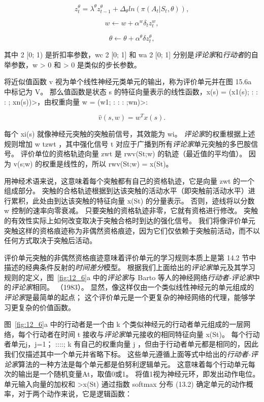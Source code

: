 \begin{equation}
	z_t^{\theta} = \lambda^{\theta} z_{t-1}^{\theta}
		+ \Delta_{\theta} ln(\pi(A_t | S_t, \theta)),
\end{equation}


\begin{equation}
	w \longleftarrow w + \alpha^w \delta_t z_t^w,
\end{equation}

\begin{equation}
	\theta \longleftarrow \theta + \alpha^{\theta} \delta z_t^{\theta},
\end{equation}

其中 2 [0; 1) 是折扣率参数，wc 2 [0; 1] 和 wa 2 [0; 1] 分别是\textit{评论家}和\textit{行动者}的自举参数，w > 0 和 > 0 是类似的步长参数。


将近似值函数 v 视为单个线性神经元类单元的输出，称为评价单元并在图 15.6a 中标记为 V。 那么值函数是状态 s 的特征向量表示的线性函数，x(s) = (x1(s); : : : ; xn(s))>，由权重向量 w = (w1; : : : ;wn)>:

\begin{equation}
	\hat{v}(s, w) = w^T x(s).
\end{equation}


每个 xi(s) 就像神经元突触的突触前信号，其效能为 wi。 
\textit{评论家}的权重根据上述规则增加 w tzwt ，其中强化信号 t 对应于广播到所有\textit{评论家}单元突触的多巴胺信号。
评价单位的资格轨迹向量 zwt 是 rwv(St;w) 的轨迹（最近值的平均值）。
因为 v(s;w) 的权重是线性的，所以 rwv(St;w) = x(St)。


用神经术语来说，这意味着每个突触都有自己的资格轨迹，它是向量 zwt 的一个组成部分。
突触的合格轨迹根据到达该突触的活动水平（即突触前活动水平）进行累积，此处由到达该突触的特征向量 x(St) 的分量表示。
否则，迹线将以分数 w 控制的速率向零衰减。
只要突触的资格轨迹非零，它就有资格进行修改。
突触的有效性实际上如何改变取决于突触合格时到达的强化信号。
我们将像评价单元突触这样的资格痕迹称为非偶然资格痕迹，因为它们仅依赖于突触前活动，而不以任何方式取决于突触后活动。


评价单元突触的非偶然资格痕迹意味着评价单元的学习规则本质上是第 14.2 节中描述的经典条件反射的\textit{时间差分}模型。
根据我们上面给出的\textit{评论家}单元及其学习规则的定义，图~\ref{fig:12_6}a 中的\textit{评论家}与 Barto 等人的神经网络\textit{行动者-评论家}中的\textit{评论家}相同。 （1983）。
显然，像这样仅由一个类似线性神经元的单元组成的\textit{评论家}是最简单的起点；
这个评价单元是一个更复杂的神经网络的代理，能够学习更复杂的价值函数。


图~\ref{fig:12_6}a 中的行动者是一个由 k 个类似神经元的行动者单元组成的一层网络，每个行动者在时间 t 接收与\textit{评论家}单元接收的相同特征向量 x(St)。
每个行动者单元j，j=1； ::::; k 有自己的权重向量 j ，但由于行动者单元都是相同的，因此我们仅描述其中一个单元并省略下标。
这些单元遵循上面等式中给出的\textit{行动者-评论家}算法的一种方法是每个单元都是伯努利逻辑单元。
这意味着每个行动单元每次的输出是一个随机变量At，取值0或1。
将值1视为神经元环，即发出动作电位。
单元输入向量的加权和 >x(St) 通过指数 softmax 分布 (13.2) 确定单元的动作概率，对于两个动作来说，它是逻辑函数：


